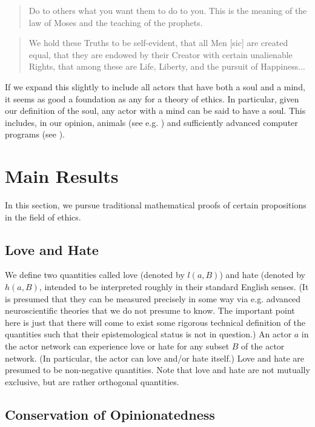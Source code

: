 \documentclass{article}
\begin{document}
\begin{quote}
  Do to others what you want them to do to you. This is the meaning of
  the law of Moses and the teaching of the prophets. \cite{mount}
\end{quote}

\begin{quote}
  We hold these Truths to be self-evident, that all Men [sic] are
  created equal, that they are endowed by their Creator with certain
  unalienable Rights, that among these are Life, Liberty, and the
  pursuit of Happiness... \cite{independence}
\end{quote}

If we expand this slightly to include all actors that have both a soul
and a mind, it seems as good a foundation as any for a theory of
ethics. In particular, given our definition of the soul, any actor
with a mind can be said to have a soul. This includes, in our opinion,
animals (see e.g. \cite{singer1995animal, coetzee1999lives}) and
sufficiently advanced computer programs (see
\cite{turing1954computing}).

\section{Main Results}

In this section, we pursue traditional mathematical proofs of certain
propositions in the field of ethics.

\subsection{Love and Hate}

We define two quantities called love (denoted by $l(a, B)$) and hate
(denoted by $h(a, B)$, intended to be interpreted roughly in their
standard English senses. (It is presumed that they can be measured
precisely in some way via e.g. advanced neuroscientific theories that
we do not presume to know. The important point here is just that there
will come to exist some rigorous technical definition of the
quantities such that their epistemological status is not in
question.) An actor $a$ in the actor network can experience love or
hate for any subset $B$ of the actor network. (In particular, the
actor can love and/or hate itself.) Love and hate are presumed to be
non-negative quantities. Note that love and hate are not mutually
exclusive, but are rather orthogonal quantities.

\subsection{Conservation of Opinionatedness}
\end{document}
